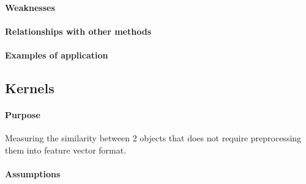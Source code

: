 \paragraph{Weaknesses}
\paragraph{Relationships with other methods}
\paragraph{Examples of application}


\subsection{Kernels}
\paragraph{Purpose}
Measuring the similarity between 2 objects that does not require preprocessing them 
into feature vector format.

\paragraph{Assumptions}
